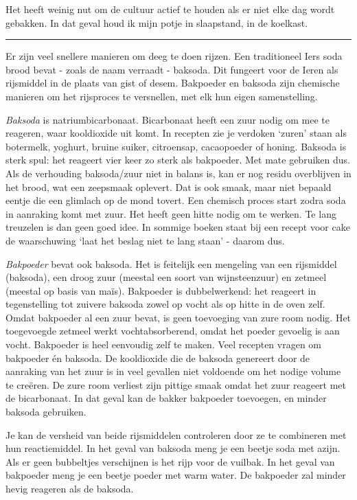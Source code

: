 \documentclass[
  11pt,
  dutch,
]{memoir}
\begin{document}
Het heeft weinig nut om de cultuur actief te houden als er niet elke dag
wordt gebakken. In dat geval houd ik mijn potje in slaapstand, in de
koelkast.

\pfbreak

Er zijn veel snellere manieren om deeg te doen rijzen. Een traditioneel
Iers soda brood bevat - zoals de naam verraadt - baksoda. Dit fungeert
voor de Ieren als rijsmiddel in de plaats van gist of desem. Bakpoeder
en baksoda zijn chemische manieren om het rijsproces te versnellen, met
elk hun eigen samenstelling.

\emph{Baksoda} is natriumbicarbonaat. Bicarbonaat heeft een zuur nodig
om mee te reageren, waar kooldioxide uit komt. In recepten zie je
verdoken `zuren' staan als botermelk, yoghurt, bruine suiker,
citroensap, cacaopoeder of honing. Baksoda is sterk spul: het reageert
vier keer zo sterk als bakpoeder. Met mate gebruiken dus. Als de
verhouding baksoda/zuur niet in balans is, kan er nog residu overblijven
in het brood, wat een zeepsmaak oplevert. Dat is ook smaak, maar niet
bepaald eentje die een glimlach op de mond tovert. Een chemisch proces
start zodra soda in aanraking komt met zuur. Het heeft geen hitte nodig
om te werken. Te lang treuzelen is dan geen goed idee. In sommige boeken
staat bij een recept voor cake de waarschuwing `laat het beslag niet te
lang staan' - daarom dus.

\emph{Bakpoeder} bevat ook baksoda. Het is feitelijk een mengeling van
een rijsmiddel (baksoda), een droog zuur (meestal een soort van
wijnsteenzuur) en zetmeel (meestal op basis van maïs). Bakpoeder is
dubbelwerkend: het reageert in tegenstelling tot zuivere baksoda zowel
op vocht als op hitte in de oven zelf. Omdat bakpoeder al een zuur
bevat, is geen toevoeging van zure room nodig. Het toegevoegde zetmeel
werkt vochtabsorberend, omdat het poeder gevoelig is aan vocht.
Bakpoeder is heel eenvoudig zelf te maken. Veel recepten vragen om
bakpoeder én baksoda. De kooldioxide die de baksoda genereert door de
aanraking van het zuur is in veel gevallen niet voldoende om het nodige
volume te creëren. De zure room verliest zijn pittige smaak omdat het
zuur reageert met de bicarbonaat. In dat geval kan de bakker bakpoeder
toevoegen, en minder baksoda gebruiken.

Je kan de versheid van beide rijsmiddelen controleren door ze te
combineren met hun reactiemiddel. In het geval van baksoda meng je een
beetje soda met azijn. Als er geen bubbeltjes verschijnen is het rijp
voor de vuilbak. In het geval van bakpoeder meng je een beetje poeder
met warm water. De bakpoeder zal minder hevig reageren als de baksoda.
\end{document}
